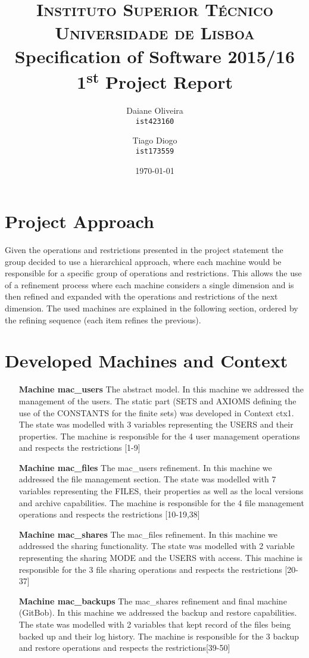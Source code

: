 \documentclass[paper=a4, fontsize=11pt]{scrartcl} %
\title{\vspace{-1.5cm}
\normalfont \normalsize 
\textsc{Instituto Superior Técnico\\Universidade de Lisboa} \\ [12pt] %
\huge Specification of Software 2015/16\\1\textsuperscript{st} Project Report \\ [5pt]
}
\author{
  Daiane Oliveira\\
  \texttt{ist423160}
  \and
  Tiago Diogo\\
  \texttt{ist173559}
}
\date{\normalsize\today} %
\numberwithin{equation}{section} %
\numberwithin{figure}{section} %
\numberwithin{table}{section} %
\begin{document}
\maketitle %

\section{Project Approach}
Given the operations and restrictions presented in the project statement the group decided to use a hierarchical approach, where each machine would be responsible for a specific group of operations and restrictions. This allows the use of a refinement process where each machine considers a single dimension and is then refined and expanded with the operations and restrictions of the next dimension. The used machines are explained in the following section, ordered by the refining sequence (each item refines the previous).

\section{Developed Machines and Context}
\begin{itemize}
	\item[\textbf{Machine mac\_users}]The abstract model. In this machine we addressed the management of the users. The static part (SETS and AXIOMS defining the use of the CONSTANTS for the finite sets) was developed in Context ctx1. The state was modelled with 3 variables representing the USERS and their properties. The machine is responsible for the 4 user management operations and respects the restrictions [1-9]
	\item[\textbf{Machine mac\_files}]The mac\_users refinement. In this machine we addressed the file management section. The state was modelled with 7 variables representing the FILES, their properties as well as the local versions and archive capabilities. The machine is responsible for the 4 file management operations and respects the restrictions [10-19,38]
	\item[\textbf{Machine mac\_shares}]The mac\_files refinement. In this machine we addressed the sharing functionality. The state was modelled with 2 variable representing the sharing MODE and the USERS with access. This machine is responsible for the 3 file sharing operations and respects the restrictions [20-37]
	\item[\textbf{Machine mac\_backups}]The mac\_shares refinement and final machine (GitBob). In this machine we addressed the backup and restore capabilities. The state was modelled with 2 variables that kept record of the files being backed up and their log history. The machine is responsible for the 3 backup and restore operations and respects the restrictions[39-50]
\end{itemize}
\end{document}
